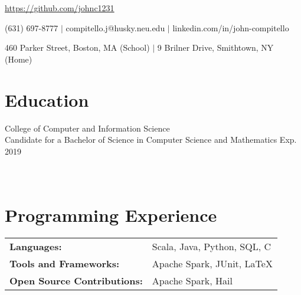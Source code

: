 \documentclass[12pt]{john_resume}
\begin{document}
\centerline{\url{https://github.com/johnc1231}}
\centerline{(631) 697-8777 $|$ compitello.j@husky.neu.edu $|$ linkedin.com/in/john-compitello}
\centerline{460 Parker Street, Boston, MA (School) $|$ 9 Brilner Drive, Smithtown, NY (Home)}

\section{Education}
College of Computer and Information Science\\
Candidate for a Bachelor of Science in Computer Science and Mathematics \hspace*{\fill} Exp. 2019 \\
 \\
 \\

\section{Programming Experience}
\begin{tabular}{l l}
\textbf{Languages:} & Scala, Java, Python, SQL, C\\
\textbf{Tools and Frameworks:} & Apache Spark, JUnit, LaTeX \\
\textbf{Open Source Contributions:} & Apache Spark, Hail
\end{tabular}
\end{document}
